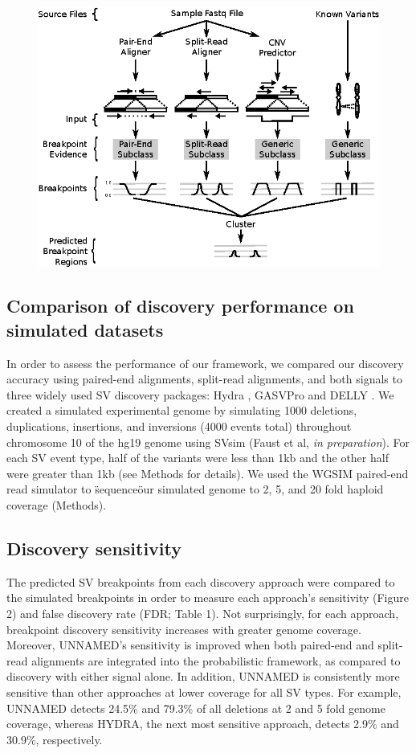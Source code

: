 \documentclass[11pt]{article}
\begin{document}
\begin{figure}
\includegraphics{Workflow.eps}
\end{figure}

\subsection{Comparison of discovery performance on simulated datasets}
In order to assess the performance of our framework, we compared our discovery
accuracy using paired-end alignments, split-read alignments, and both signals to 
three widely used SV discovery packages: Hydra \cite{Quinlan2010},
GASVPro \cite{Sindi2012} and DELLY \cite{Rausch2012b}. We created a simulated 
experimental genome by simulating 1000 deletions, duplications, insertions, 
and inversions (4000 events total) throughout chromosome 10 of the hg19 genome 
using SVsim (Faust et al, \emph{in preparation}).  For each SV event type, half
of the variants were less than 1kb and the other half were greater than 1kb (see
Methods for details).  We used the WGSIM \cite{Li2008} paired-end read 
simulator to \"sequence\" our simulated genome to 2, 5, and 20 fold 
haploid coverage (Methods).

\subsection{Discovery sensitivity}
The predicted SV breakpoints from each discovery approach were compared to the
simulated breakpoints in order to measure each approach's sensitivity (Figure 2) 
and false discovery rate (FDR; Table 1). Not surprisingly, for each approach,
breakpoint discovery sensitivity increases with greater genome coverage.
Moreover, UNNAMED's sensitivity is improved when both paired-end and split-read
alignments are integrated into the probabilistic framework, as compared to 
discovery with either signal alone. In addition, UNNAMED is consistently more
sensitive than other approaches at lower coverage for all SV types. For example,
UNNAMED detects 24.5\% and 79.3\% of all deletions at 2 and 5 fold genome
coverage, whereas HYDRA, the next most sensitive approach, detects 2.9\% and
30.9\%, respectively. 
\end{document}
